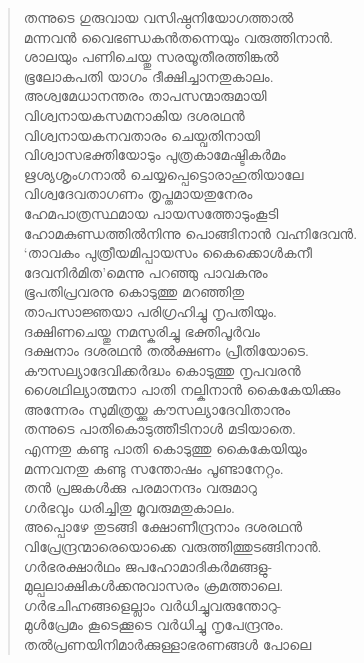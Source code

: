 \begin{verse}
തന്നുടെ ഗുരുവായ വസിഷ്ഠനിയോഗത്താല്‍\\
മന്നവന്‍ വൈഭണ്ഡകന്‍തന്നെയും വരുത്തിനാന്‍.\\
ശാലയും പണിചെയ്തു സരയൂതീരത്തിങ്കല്‍\\
ഭൂലോകപതി യാഗം ദീക്ഷിച്ചാനതുകാലം.\\
അശ്വമേധാനന്തരം താപസന്മാരുമായി\\
വിശ്വനായകസമനാകിയ ദശരഥന്‍\\
വിശ്വനായകനവതാരം ചെയ്വതിനായി\\
വിശ്വാസഭക്തിയോടും പുത്രകാമേഷ്ടികര്‍മം\\
ഋശ്യശൃംഗനാല്‍ ചെയ്യപ്പെട്ടൊരാഹുതിയാലേ\\
വിശ്വദേവതാഗണം തൃപ്തമായതുനേരം\\
ഹേമപാത്രസ്ഥമായ പായസത്തോടുംകൂടി\\
ഹോമകുണ്ഡത്തില്‍നിന്നു പൊങ്ങിനാന്‍ വഹ്നിദേവന്‍.\\
‘താവകം പുത്രീയമിപ്പായസം കൈക്കൊള്‍കനീ\\
ദേവനിര്‍മിത’മെന്നു പറഞ്ഞു പാവകനും\\
ഭൂപതിപ്രവരനു കൊടുത്തു മറഞ്ഞിതു\\
താപസാജ്ഞയാ പരിഗ്രഹിച്ചു നൃപതിയും.\\
ദക്ഷിണചെയ്തു നമസ്കരിച്ചു ഭക്തിപൂര്‍വം\\
ദക്ഷനാം ദശരഥന്‍ തല്‍ക്ഷണം പ്രീതിയോടെ.\\
കൗസല്യാദേവിക്കര്‍ദ്ധം കൊടുത്തു നൃപവരന്‍\\
ശൈഥില്യാത്മനാ പാതി നല്കിനാന്‍ കൈകേയിക്കും\\
അന്നേരം സുമിത്രയ്ക്കു കൗസല്യാദേവിതാനും\\
തന്നുടെ പാതികൊടുത്തീടിനാള്‍ മടിയാതെ.\\
എന്നതു കണ്ടു പാതി കൊടുത്തു കൈകേയിയും\\
മന്നവനതു കണ്ടു സന്തോഷം പൂണ്ടാനേറ്റം.\\
തന്‍ പ്രജകള്‍ക്കു പരമാനന്ദം വരുമാറു\\
ഗര്‍ഭവും ധരിച്ചിതു മൂവരുമതുകാലം.\\
അപ്പൊഴേ തുടങ്ങി ക്ഷോണീന്ദ്രനാം ദശരഥന്‍\\
വിപ്രേന്ദ്രന്മാരെയൊക്കെ വരുത്തിത്തുടങ്ങിനാന്‍.\\
ഗര്‍ഭരക്ഷാര്‍ഥം ജപഹോമാദികര്‍മങ്ങളു-\\
മുല്പലാക്ഷികള്‍ക്കനുവാസരം ക്രമത്താലെ.\\
ഗര്‍ഭചിഹ്നങ്ങളെല്ലാം വര്‍ധിച്ചുവരുന്തോറു-\\
മുള്‍പ്രേമം കൂടെക്കൂടെ വര്‍ധിച്ചു നൃപേന്ദ്രനും.\\
തല്‍പ്രണയിനിമാര്‍ക്കുള്ളാഭരണങ്ങള്‍ പോലെ\\

\end{verse}
